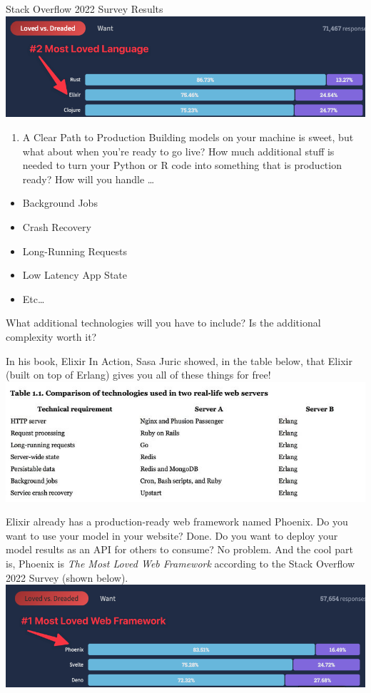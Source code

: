 \documentclass[
  letterpaper,
  DIV=11,
  numbers=noendperiod]{scrreprt}
\providecommand{\tightlist}{%
  \setlength{\itemsep}{0pt}\setlength{\parskip}{0pt}}\usepackage{longtable,booktabs,array}
\begin{document}
Stack Overflow 2022 Survey Results
\includegraphics{./images/1.1-stackoverflowsurvey.png}

\begin{enumerate}
\def\labelenumi{\arabic{enumi}.}
\setcounter{enumi}{3}
\tightlist
\item
  A Clear Path to Production Building models on your machine is sweet,
  but what about when you're ready to go live? How much additional stuff
  is needed to turn your Python or R code into something that is
  production ready? How will you handle \ldots{}
\end{enumerate}

\begin{itemize}
\tightlist
\item
  Background Jobs
\item
  Crash Recovery
\item
  Long-Running Requests
\item
  Low Latency App State
\item
  Etc\ldots{}
\end{itemize}

What additional technologies will you have to include? Is the additional
complexity worth it?

In his book, Elixir In Action, Sasa Juric showed, in the table below,
that Elixir (built on top of Erlang) gives you all of these things for
free! \includegraphics{./images/1.2-elixirinaction.jpeg}

Elixir already has a production-ready web framework named Phoenix. Do
you want to use your model in your website? Done. Do you want to deploy
your model results as an API for others to consume? No problem. And the
cool part is, Phoenix is \emph{The Most Loved Web Framework} according
to the Stack Overflow 2022 Survey (shown below).
\includegraphics{./images/1.3-stackoverflowsurvey.png}
\end{document}
